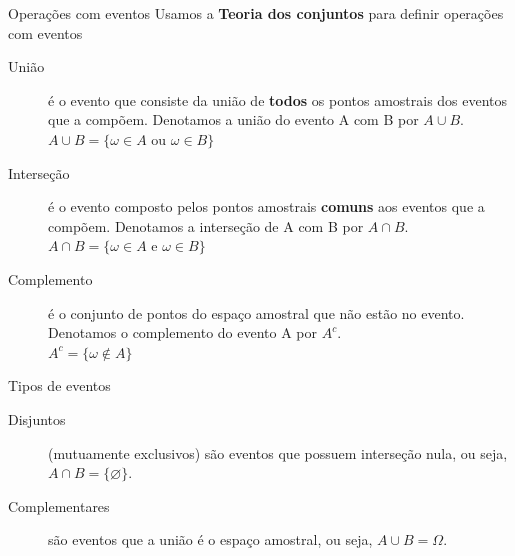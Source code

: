 \documentclass[10pt]{beamer}\usepackage[]{graphicx}\usepackage[]{color}
\theoremstyle{definition}
\begin{document}
\begin{frame}{Operações com eventos}
  Usamos a \textbf{Teoria dos conjuntos} para definir operações com
  eventos
  \begin{block}{}
\begin{description}
 \item[União] é o evento que consiste da união de \textbf{todos} os pontos
   amostrais dos eventos que a compõem. Denotamos a união do evento A
   com B por $A\cup B$.\\
   $A \cup B = \{\omega \in A \text{ ou } \omega \in B\}$
 \item[Interseção] é o evento composto pelos pontos amostrais
   \textbf{comuns} aos eventos que a compõem. Denotamos a interseção de
   A com B por $A\cap B$.\\
   $A \cap B = \{\omega \in A \text{ e } \omega \in B\}$
 \item[Complemento] é o conjunto de pontos do espaço amostral que não
   estão no evento. Denotamos o complemento do evento A por $A^c$.\\
   $A^c = \{\omega \not\in A \}$
\end{description}
\end{block}
\end{frame}

\begin{frame}[fragile]{Tipos de eventos}
\begin{block}{}
\begin{description}
 \item[Disjuntos] (mutuamente exclusivos) são eventos que possuem
   interseção nula, ou seja, $A\cap B = \{\varnothing\}$.
 \item[Complementares] são eventos que a união é o espaço amostral, ou
   seja, $A\cup B = \Omega$.
\end{description}
\end{block}
\end{frame}



\end{document}
